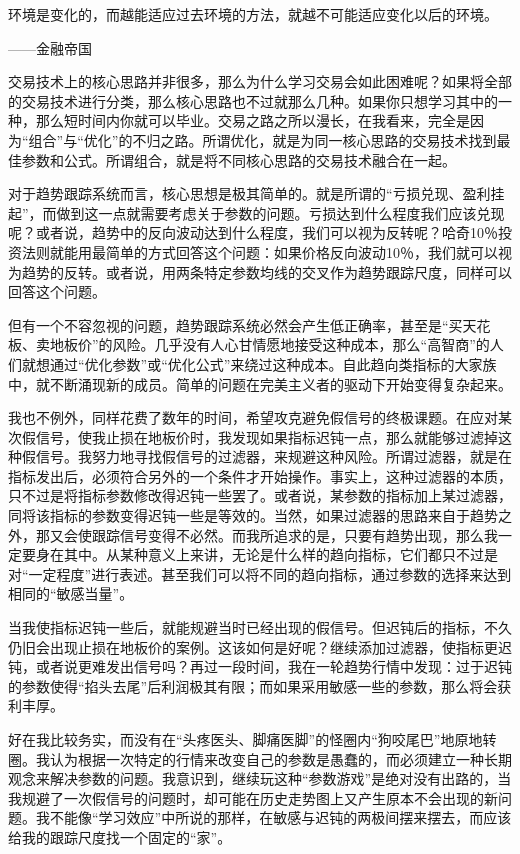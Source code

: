 {\kaishu
环境是变化的，而越能适应过去环境的方法，就越不可能适应变化以后的环境。

\hfill ——金融帝国
}

交易技术上的核心思路并非很多，那么为什么学习交易会如此困难呢？如果将全部的交易技术进行分类，那么核心思路也不过就那么几种。如果你只想学习其中的一种，那么短时间内你就可以毕业。交易之路之所以漫长，在我看来，完全是因为“组合”与“优化”的不归之路。所谓优化，就是为同一核心思路的交易技术找到最佳参数和公式。所谓组合，就是将不同核心思路的交易技术融合在一起。

对于趋势跟踪系统而言，核心思想是极其简单的。就是所谓的“亏损兑现、盈利挂起”，而做到这一点就需要考虑关于参数的问题。亏损达到什么程度我们应该兑现呢？或者说，趋势中的反向波动达到什么程度，我们可以视为反转呢？哈奇10％投资法则就能用最简单的方式回答这个问题：如果价格反向波动10％，我们就可以视为趋势的反转。或者说，用两条特定参数均线的交叉作为趋势跟踪尺度，同样可以回答这个问题。

但有一个不容忽视的问题，趋势跟踪系统必然会产生低正确率，甚至是“买天花板、卖地板价”的风险。几乎没有人心甘情愿地接受这种成本，那么“高智商”的人们就想通过“优化参数”或“优化公式”来绕过这种成本。自此趋向类指标的大家族中，就不断涌现新的成员。简单的问题在完美主义者的驱动下开始变得复杂起来。

我也不例外，同样花费了数年的时间，希望攻克避免假信号的终极课题。在应对某次假信号，使我止损在地板价时，我发现如果指标迟钝一点，那么就能够过滤掉这种假信号。我努力地寻找假信号的过滤器，来规避这种风险。所谓过滤器，就是在指标发出后，必须符合另外的一个条件才开始操作。事实上，这种过滤器的本质，只不过是将指标参数修改得迟钝一些罢了。或者说，某参数的指标加上某过滤器，同将该指标的参数变得迟钝一些是等效的。当然，如果过滤器的思路来自于趋势之外，那又会使跟踪信号变得不必然。而我所追求的是，只要有趋势出现，那么我一定要身在其中。从某种意义上来讲，无论是什么样的趋向指标，它们都只不过是对“一定程度”进行表述。甚至我们可以将不同的趋向指标，通过参数的选择来达到相同的“敏感当量”。

当我使指标迟钝一些后，就能规避当时已经出现的假信号。但迟钝后的指标，不久仍旧会出现止损在地板价的案例。这该如何是好呢？继续添加过滤器，使指标更迟钝，或者说更难发出信号吗？再过一段时间，我在一轮趋势行情中发现：过于迟钝的参数使得“掐头去尾”后利润极其有限；而如果采用敏感一些的参数，那么将会获利丰厚。

好在我比较务实，而没有在“头疼医头、脚痛医脚”的怪圈内“狗咬尾巴”地原地转圈。我认为根据一次特定的行情来改变自己的参数是愚蠢的，而必须建立一种长期观念来解决参数的问题。我意识到，继续玩这种“参数游戏”是绝对没有出路的，当我规避了一次假信号的问题时，却可能在历史走势图上又产生原本不会出现的新问题。我不能像“学习效应”中所说的那样，在敏感与迟钝的两极间摆来摆去，而应该给我的跟踪尺度找一个固定的“家”。

